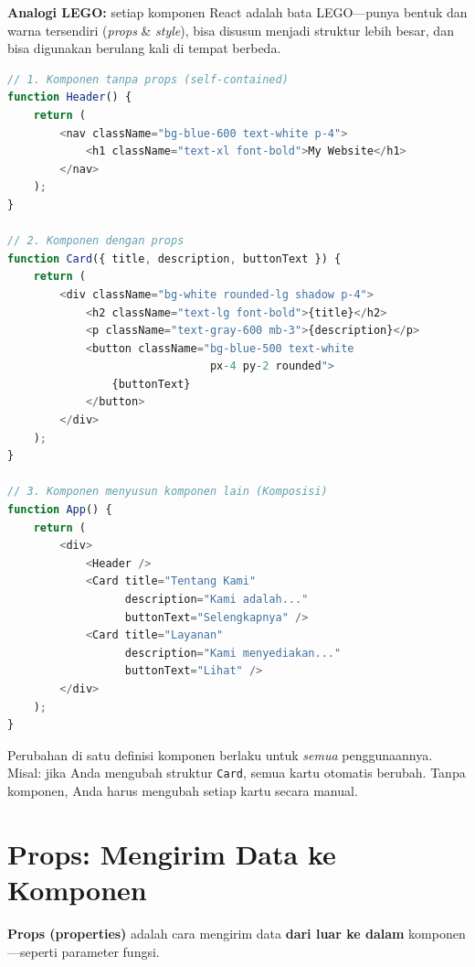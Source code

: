 \textbf{Analogi LEGO:} setiap komponen React adalah bata LEGO---punya bentuk dan warna tersendiri (\emph{props} \& \emph{style}), bisa disusun menjadi struktur lebih besar, dan bisa digunakan berulang kali di tempat berbeda.

\begin{lstlisting}[language=JavaScript, caption={Tiga pola komponen: tanpa props, dengan props, dan komposisi}, label={lst:13-pola-komponen}]
// 1. Komponen tanpa props (self-contained)
function Header() {
    return (
        <nav className="bg-blue-600 text-white p-4">
            <h1 className="text-xl font-bold">My Website</h1>
        </nav>
    );
}

// 2. Komponen dengan props
function Card({ title, description, buttonText }) {
    return (
        <div className="bg-white rounded-lg shadow p-4">
            <h2 className="text-lg font-bold">{title}</h2>
            <p className="text-gray-600 mb-3">{description}</p>
            <button className="bg-blue-500 text-white
                               px-4 py-2 rounded">
                {buttonText}
            </button>
        </div>
    );
}

// 3. Komponen menyusun komponen lain (Komposisi)
function App() {
    return (
        <div>
            <Header />
            <Card title="Tentang Kami"
                  description="Kami adalah..."
                  buttonText="Selengkapnya" />
            <Card title="Layanan"
                  description="Kami menyediakan..."
                  buttonText="Lihat" />
        </div>
    );
}
\end{lstlisting}

\begin{tip}
Perubahan di satu definisi komponen berlaku untuk \emph{semua} penggunaannya. Misal: jika Anda mengubah struktur \texttt{Card}, semua kartu otomatis berubah. Tanpa komponen, Anda harus mengubah setiap kartu secara manual.
\end{tip}

\section{Props: Mengirim Data ke Komponen}
\label{sec:13-props}

\textbf{Props (properties)} adalah cara mengirim data \textbf{dari luar ke dalam} komponen---seperti parameter fungsi.

